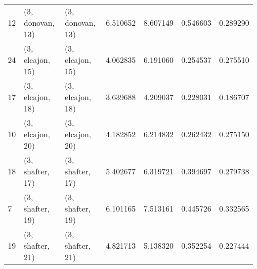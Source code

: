 \begin{tabular}{lllrrrr}
12 &  (3, donovan, 13) &  (3, donovan, 13) &  6.510652 &  8.607149 &   0.546603 &  0.289290 \\
24 &  (3, elcajon, 15) &  (3, elcajon, 15) &  4.062835 &  6.191060 &   0.254537 &  0.275510 \\
17 &  (3, elcajon, 18) &  (3, elcajon, 18) &  3.639688 &  4.209037 &   0.228031 &  0.186707 \\
10 &  (3, elcajon, 20) &  (3, elcajon, 20) &  4.182852 &  6.214832 &   0.262432 &  0.275150 \\
18 &  (3, shafter, 17) &  (3, shafter, 17) &  5.402677 &  6.319721 &   0.394697 &  0.279738 \\
7  &  (3, shafter, 19) &  (3, shafter, 19) &  6.101165 &  7.513161 &   0.445726 &  0.332565 \\
19 &  (3, shafter, 21) &  (3, shafter, 21) &  4.821713 &  5.138320 &   0.352254 &  0.227444 \\
\bottomrule
\end{tabular}
